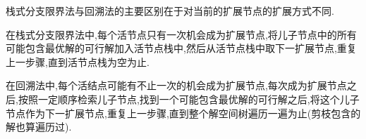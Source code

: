 \documentclass[a4paper,12pt]{article}
\theoremstyle{definition}
\theoremstyle{remark}
\numberwithin{equation}{section}
\begin{document}
栈式分支限界法与回溯法的主要区别在于对当前的扩展节点的扩展方式不同.

在栈式分支限界法中,每个活节点只有一次机会成为扩展节点,将儿子节点中的所有可能包含最优解的可行解加入活节点栈中,然后从活节点栈中取下一扩展节点,重复上一步骤,直到活节点栈为空为止.

在回溯法中,每个活结点可能有不止一次的机会成为扩展节点,每次成为扩展节点之后,按照一定顺序检索儿子节点,找到一个可能包含最优解的可行解之后,将这个儿子节点作为下一扩展节点,重复上一步骤,直到整个解空间树遍历一遍为止(剪枝包含的解也算遍历过).
\end{document}
